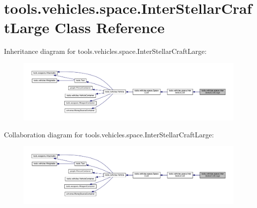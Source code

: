 \hypertarget{classtools_1_1vehicles_1_1space_1_1_inter_stellar_craft_large}{}\section{tools.\+vehicles.\+space.\+Inter\+Stellar\+Craft\+Large Class Reference}
\label{classtools_1_1vehicles_1_1space_1_1_inter_stellar_craft_large}


Inheritance diagram for tools.\+vehicles.\+space.\+Inter\+Stellar\+Craft\+Large\+:
\nopagebreak
\begin{figure}[H]
\begin{center}
\leavevmode
\includegraphics[width=350pt]{classtools_1_1vehicles_1_1space_1_1_inter_stellar_craft_large__inherit__graph}
\end{center}
\end{figure}


Collaboration diagram for tools.\+vehicles.\+space.\+Inter\+Stellar\+Craft\+Large\+:
\nopagebreak
\begin{figure}[H]
\begin{center}
\leavevmode
\includegraphics[width=350pt]{classtools_1_1vehicles_1_1space_1_1_inter_stellar_craft_large__coll__graph}
\end{center}
\end{figure}
